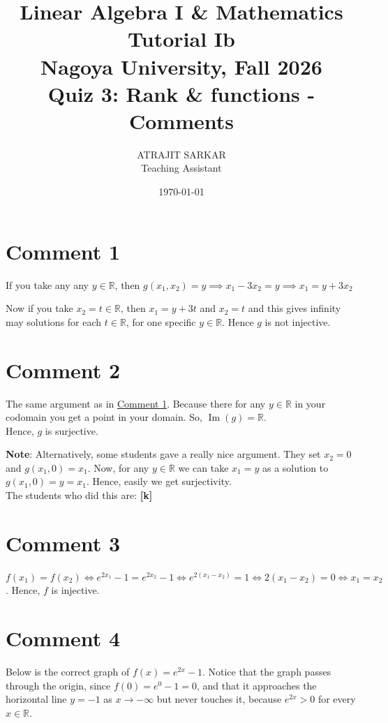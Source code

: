 \documentclass{article}
\title{\large Linear Algebra I \& Mathematics Tutorial Ib\\
\normalsize Nagoya University, Fall 2026\\[1.2em]
\LARGE Quiz 3: Rank \& functions - Comments}
\author{ATRAJIT SARKAR\\ \small Teaching Assistant}
\date{\today}
\theoremstyle{definition}
\begin{document}
\maketitle

\tableofcontents

\pagebreak

\section{Comment 1}\label{Comment1}

If you take any any $y \in \mathbb{R}$, then $g(x_1,x_2)=y \implies x_1-3x_2=y \implies x_1=y+3x_2$

Now if you take $x_2=t \in \mathbb{R}$, then $x_1=y+3t$ and $x_2=t$ and this gives infinity may solutions for each $t\in \mathbb{R}$, for one specific $y \in \mathbb{R}$. Hence $g$ is not injective.

\section{Comment 2}\label{Comment2}
The same argument as in \hyperref[Comment1]{Comment 1}.
Because there for any $y \in \mathbb{R}$ in your codomain you get a point in your domain. So, $\operatorname{Im}(g)=\mathbb{R}$. \\
Hence, $g$ is surjective.

\textbf{Note}: Alternatively, some students gave a really nice argument. They set $x_2=0$ and $g(x_1,0)=x_1$. Now, for any $y \in \mathbb{R}$ we can take $x_1=y$ as a solution to $g(x_1,0)=y=x_1$. Hence, easily we get surjectivity. \\

The students who did this are: \textbf{[k]}

\section{Comment 3}
$f(x_1)=f(x_2)\iff  e^{2x_1}-1=e^{2x_2}-1 \iff e^{2(x_1-x_2)}=1 \iff 2(x_1-x_2)=0 \iff x_1=x_2$. Hence, $f$ is injective.

\section{Comment 4}\label{Comment4}
Below is the correct graph of $f(x)=e^{2x}-1$. Notice that the graph passes through the origin, since $f(0)=e^{0}-1=0$, and that it approaches the horizontal line $y=-1$ as $x\to-\infty$ but never touches it, because $e^{2x}>0$ for every $x\in\mathbb{R}$.
\end{document}
